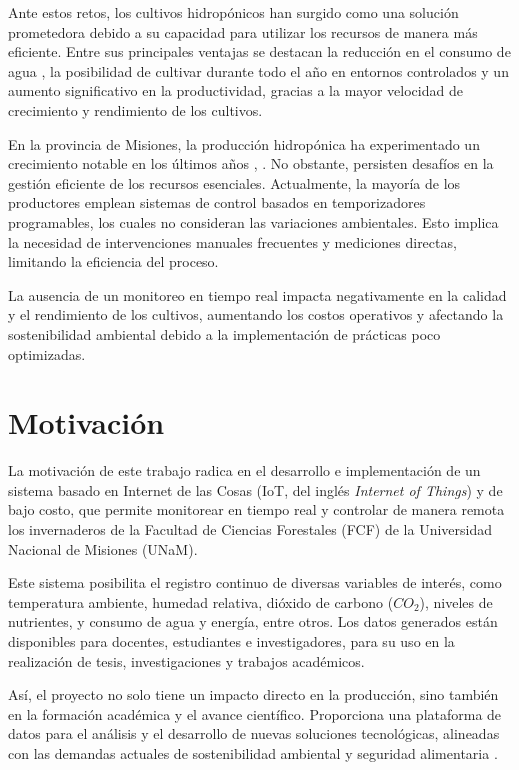 Ante estos retos, los cultivos hidropónicos han surgido como una solución
prometedora debido a su capacidad para utilizar los recursos de manera más
eficiente. Entre sus principales ventajas se destacan la reducción en el
consumo de agua \cite{EficienciaAgua2014}, la posibilidad de cultivar durante
todo el año en entornos controlados y un aumento significativo en la
productividad, gracias a la mayor velocidad de crecimiento y rendimiento de los
cultivos.

En la provincia de Misiones, la producción hidropónica ha experimentado un
crecimiento notable en los últimos años \cite{HorticulturaMisiones2024},
\cite{HidroponiaMisiones2024}. No obstante, persisten desafíos en la gestión
eficiente de los recursos esenciales. Actualmente, la mayoría de los
productores emplean sistemas de control basados en temporizadores programables,
los cuales no consideran las variaciones ambientales. Esto implica la necesidad
de intervenciones manuales frecuentes y mediciones directas, limitando la
eficiencia del proceso.

La ausencia de un monitoreo en tiempo real impacta negativamente en la calidad
y el rendimiento de los cultivos, aumentando los costos operativos y afectando
la sostenibilidad ambiental debido a la implementación de prácticas poco
optimizadas.


\section{Motivación}

La motivación de este trabajo radica en el desarrollo e implementación de un
sistema basado en Internet de las Cosas (IoT, del inglés \textit{Internet of
      Things}) y de bajo costo, que permite monitorear en tiempo real y controlar de
manera remota los invernaderos de la Facultad de Ciencias Forestales (FCF) de
la Universidad Nacional de Misiones (UNaM).

Este sistema posibilita el registro continuo de diversas variables de interés,
como temperatura ambiente, humedad relativa, dióxido de carbono ($CO_2$),
niveles de nutrientes, y consumo de agua y energía, entre otros. Los datos
generados están disponibles para docentes, estudiantes e investigadores, para
su uso en la realización de tesis, investigaciones y trabajos académicos.

Así, el proyecto no solo tiene un impacto directo en la producción, sino
también en la formación académica y el avance científico. Proporciona una
plataforma de datos para el análisis y el desarrollo de nuevas soluciones
tecnológicas, alineadas con las demandas actuales de sostenibilidad ambiental y
seguridad alimentaria \cite{seguridadAlimentariaGaribaldi2018}.

